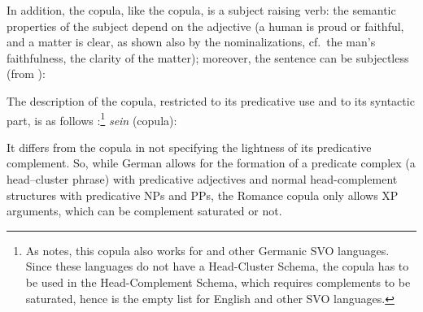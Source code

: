     \label{GSexemple47c}
		     
	\label{GSexemple47d}
\zl

\noindent
In addition, the  copula, like the  copula, is a subject raising verb: the semantic properties of the subject depend on the adjective (a human is proud or faithful, and a matter is clear, as shown also by the nominalizations, cf.\ the man's faithfulness, the clarity of the matter); moreover, the sentence can be subjectless (from \citealt[72]{Mueller2002b}): 

\z

\noindent
The description of the  copula, restricted to its predicative use and to its syntactic
part, is as follows \citep[]{MuellerPredication}:\footnote{
  As \citet[]{MuellerPredication} notes, this copula also works for  and
    other Germanic SVO languages. Since these languages do not have a Head-Cluster Schema, the
    copula has to be used in the Head-Complement Schema, which requires complements to be saturated,
    hence  is the empty list for English and other  SVO languages.
}
\ea
\label{GSexemple49}
\emph{sein} (copula): \\
\z

\noindent
It differs from the  copula in not specifying the lightness of its predicative
complement. So, while German allows for the formation of a predicate complex (a head–cluster phrase) with predicative
  adjectives and normal head-complement structures with predicative NPs and PPs, the Romance copula only
  allows XP arguments, which can be complement saturated or not.

